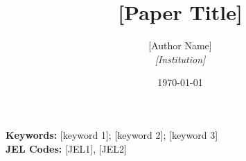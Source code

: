 \documentclass[12pt]{article}
\title{[Paper Title]}
\author{[Author Name]\\[0.4em]\textit{[Institution]}}
\date{\today}
\begin{document}
\maketitle

\begin{abstract}

\end{abstract}

\noindent\textbf{Keywords:} [keyword 1]; [keyword 2]; [keyword 3]\\
\textbf{JEL Codes:} [JEL1], [JEL2]

\clearpage








\clearpage


\end{document}
